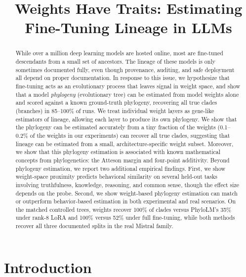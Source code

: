 \documentclass{article}
\title{Weights Have Traits: Estimating Fine-Tuning Lineage in LLMs}
\theoremstyle{definition}
\theoremstyle{plain}
\begin{document}
\maketitle

\begin{abstract}
While over a million deep learning models are hosted online, most are fine-tuned descendants from a small set of ancestors.  The lineage of these models is only sometimes documented fully, even though provenance, auditing, and safe deployment all depend on proper documentation. In response to this issue, we hypothesize that fine-tuning acts as an evolutionary process that leaves signal in weight space, and show that a model \textit{phylogeny} (evolutionary tree) can be estimated from model weights alone and scored against a known ground-truth phylogeny, recovering all true clades (branches) in 85--100\% of runs.  We treat individual weight layers as gene-like estimators of lineage, allowing each layer to produce its own phylogeny.  We show that the phylogeny can be estimated accurately from a tiny fraction of the weights (0.1--0.2\% of the weights in our experiments) can recover all true clades, suggesting that lineage can be estimated from a small, architecture-specific weight subset. Moreover, we show that this phylogeny estimation is associated with known mathematical concepts from phylogenetics: the Atteson margin and four-point additivity. Beyond phylogeny estimation, we report two additional empirical findings. First, we show weight-space proximity predicts behavioral similarity on several held-out tasks involving truthfulness, knowledge, reasoning, and common sense, though the effect size depends on the probe. Second, we show weight-based phylogeny estimation can match or outperform behavior-based estimation in both experimental and real scenarios. On the matched controlled trees, weights recover 100\% of clades versus PhyloLM's 35\% under rank-8 LoRA and 100\% versus 52\% under full fine-tuning, while both methods recover all three documented splits in the real Mistral family.

\end{abstract}

\section{Introduction}
\label{sec:intro}
\end{document}
